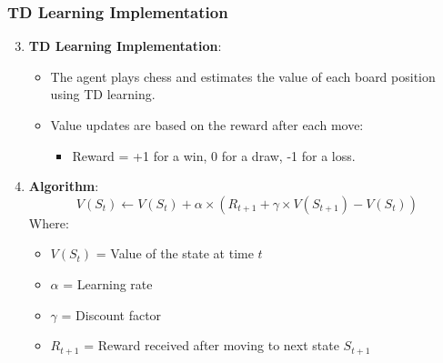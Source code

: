 \documentclass[aspectratio=169]{beamer}
\begin{document}
\begin{frame}[fragile]
    \frametitle{TD Learning Implementation}
    \begin{enumerate}
        \setcounter{enumi}{2}
        \item \textbf{TD Learning Implementation}:
            \begin{itemize}
                \item The agent plays chess and estimates the value of each board position using TD learning.
                \item Value updates are based on the reward after each move:
                \begin{itemize}
                    \item Reward = +1 for a win, 0 for a draw, -1 for a loss.
                \end{itemize}
            \end{itemize}
        \item \textbf{Algorithm}:
            \begin{equation}
                V(S_t) \leftarrow V(S_t) + \alpha \times (R_{t+1} + \gamma \times V(S_{t+1}) - V(S_t))
            \end{equation}
            Where:
            \begin{itemize}
                \item $V(S_t)$ = Value of the state at time $t$
                \item $\alpha$ = Learning rate
                \item $\gamma$ = Discount factor
                \item $R_{t+1}$ = Reward received after moving to next state $S_{t+1}$
            \end{itemize}
    \end{enumerate}
\end{frame}
\end{document}
